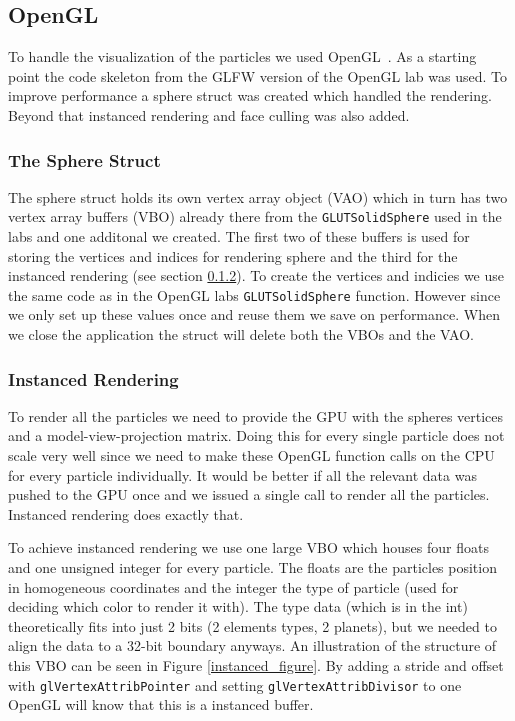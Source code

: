 \documentclass[a4paper]{article}
\begin{document}
\subsection{OpenGL}

To handle the visualization of the particles we used OpenGL~\cite{opengl}. 
As a starting point the code skeleton from the GLFW version of the OpenGL lab was used. 
To improve performance a sphere struct was created which handled the rendering. 
Beyond that instanced rendering and face culling was also added. 

\subsubsection{The Sphere Struct}
\label{sphere_struct}

The sphere struct holds its own vertex array object (VAO) which in turn has two vertex array buffers (VBO) already there from the \verb|GLUTSolidSphere| used in the labs and one additonal we created. 
The first two of these buffers is used for storing the vertices and indices for rendering sphere and the third for the instanced rendering (see section \ref{instanced}). 
To create the vertices and indicies we use the same code as in the OpenGL labs \verb|GLUTSolidSphere| function. 
However since we only set up these values once and reuse them we save on performance.
When we close the application the struct will delete both the VBOs and the VAO. 

\subsubsection{Instanced Rendering}
\label{instanced}

To render all the particles we need to provide the GPU with the spheres vertices and a model-view-projection matrix. 
Doing this for every single particle does not scale very well since we need to make these OpenGL function calls on the CPU for every particle individually.
It would be better if all the relevant data was pushed to the GPU once and we issued a single call to render all the particles. 
Instanced rendering does exactly that. 

To achieve instanced rendering we use one large VBO which houses four floats and one unsigned integer for every particle. 
The floats are the particles position in homogeneous coordinates and the integer the type of particle (used for deciding which color to render it with). 
The type data (which is in the int) theoretically fits into just 2 bits (2 elements types, 2 planets), but we needed to align the data to a 32-bit boundary anyways.
An illustration of the structure of this VBO can be seen in Figure \ref{instanced_figure}.
By adding a stride and offset with \verb|glVertexAttribPointer| and setting \verb|glVertexAttribDivisor| to one OpenGL will know that this is a instanced buffer. 
\end{document}

